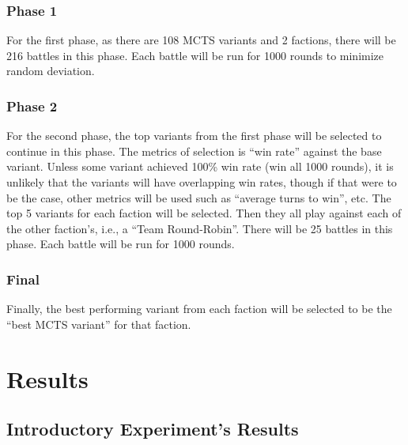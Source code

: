 \subsubsection{Phase 1}
For the first phase, as there are 108 MCTS variants and 2 factions, there will be 216 battles in this phase. Each battle will be run for 1000 rounds to minimize random deviation.

\subsubsection{Phase 2}
For the second phase, the top variants from the first phase will be selected to continue in this phase. The metrics of selection is ``win rate'' against the base variant. Unless some variant achieved 100\% win rate (win all 1000 rounds), it is unlikely that the variants will have overlapping win rates, though if that were to be the case, other metrics will be used such as ``average turns to win'', etc. The top 5 variants for each faction will be selected. Then they all play against each of the other faction's, i.e., a ``Team Round-Robin''. There will be 25 battles in this phase. Each battle will be run for 1000 rounds.

\subsubsection{Final}
Finally, the best performing variant from each faction will be selected to be the ``best MCTS variant'' for that faction.



\section{Results}

\subsection{Introductory Experiment's Results}

